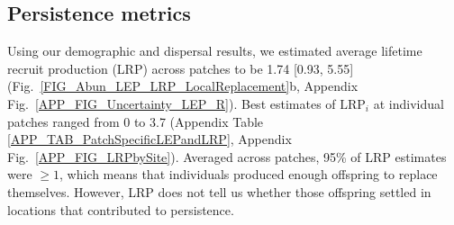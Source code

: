 \documentclass[12pt, oneside]{article}   	%
\begin{document}

\subsection*{Persistence metrics}

Using our demographic and dispersal results, we estimated average lifetime recruit production (LRP) across patches to be 1.74 [0.93, 5.55] (Fig.\ \ref{FIG_Abun_LEP_LRP_LocalReplacement}b, Appendix Fig.\ \ref{APP_FIG_Uncertainty_LEP_R}). Best estimates of $\text{LRP}_i$ at individual patches ranged from 0 to 3.7 (Appendix Table \ref{APP_TAB_PatchSpecificLEPandLRP}, Appendix Fig.\ \ref{APP_FIG_LRPbySite}). Averaged across patches, 95\% of LRP estimates were $\geq 1$, which means that individuals produced enough offspring to replace themselves. However, LRP does not tell us whether those offspring settled in locations that contributed to persistence.

\end{document}
